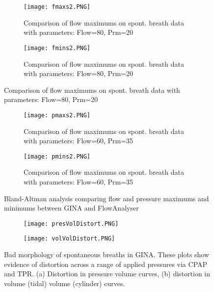 \documentclass[12pt, openany, oneside]{book}
\begin{document}
\begin{figure}
\centering
	\begin{subfigure}[t]{0.9\textwidth}
		\centering
		\texttt{[image: fmaxs2.PNG]}		
		\caption{Comparison of flow maximums on spont. breath data with parameters: Flow=80, Prm=20}
		\label{fig:baf2max}
	\end{subfigure}%
	\hfill
	\begin{subfigure}[t]{0.9\textwidth}
		\centering
		\texttt{[image: fmins2.PNG]}		
		\caption{Comparison of flow maximums on spont. breath data with parameters: Flow=80, Prm=20}
		\label{fig:baf2min}
	\end{subfigure}
\end{figure}
\begin{figure}\ContinuedFloat
\centering
	\begin{subfigure}[t]{0.9\textwidth}
		\centering
		\texttt{[image: pmaxs2.PNG]}		
		\caption{Comparison of flow maximums on spont. breath data with parameters: Flow=60, Prm=35}
		\label{fig:bap2max}
	\end{subfigure}%
	\hfill
	\hfill
	\begin{subfigure}[t]{0.9\textwidth}
		\centering
		\texttt{[image: pmins2.PNG]}		
		\caption{Comparison of flow maximums on spont. breath data with parameters: Flow=60, Prm=35}
		\label{fig:bap2min}
	\end{subfigure}
	\caption{Bland-Altman analysis comparing flow and pressure maximums and minimums between GINA and FlowAnalyser}
	\label{fig:bas}
\end{figure}




\begin{figure}
\centering
	\begin{subfigure}[t]{0.99\textwidth}
		\centering
		\texttt{[image: presVolDistort.PNG]}		
		\caption{}
		\label{fig:bad1}
	\end{subfigure}%
	\hfill
	\begin{subfigure}[t]{0.7\textwidth}
		\centering
		\texttt{[image: volVolDistort.PNG]}		
		\caption{}
		\label{fig:bad2}
	\end{subfigure}
	
\caption[Bad morphology of spontaneous breaths in GINA]{Bad morphology of spontaneous breaths in GINA. These plots show evidence of distortion across a range of applied pressures via CPAP and TPR. (a) Distortion in pressure volume curves, (b) distortion in volume (tidal) volume (cylinder) curves.}

\label{fig:morph}

\end{figure}
\end{document}
